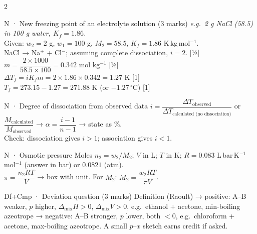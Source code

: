 \documentclass[10pt,a4paper]{extarticle}
\newcommand{\mk}[1]{{\scriptsize\color{black!55}[#1]}}
\begin{document}
\begin{multicols}{2}
\begin{skel}{N · New freezing point of an electrolyte solution (3 marks)}
\textit{e.g.\ 2 g NaCl (58.5) in 100 g water, $K_f=1.86$.}\\
Given: $w_2=2$ g, $w_1=100$ g, $M_2=58.5$, $K_f=1.86$ K\,kg\,mol$^{-1}$.\\
NaCl → Na$^+$ + Cl$^-$; assuming complete dissociation, $i=2$. \mk{½}\\
$m=\dfrac{2\times1000}{58.5\times100}=0.342$ mol kg$^{-1}$ \mk{½}\\
$\Delta T_f=iK_fm=2\times1.86\times0.342=1.27$ K \mk{1}\\
$T_f=273.15-1.27=\boxed{271.88\text{ K}}$ \;(or $-1.27\,^\circ$C) \mk{1}
\end{skel}
\begin{skel}{N · Degree of dissociation from observed data}
$i=\dfrac{\Delta T_\text{observed}}{\Delta T_\text{calculated (no dissociation)}}$ or $\dfrac{M_\text{calculated}}{M_\text{observed}}$ → $\alpha=\dfrac{i-1}{n-1}$ → state as \%.\\
Check: dissociation gives $i>1$; association gives $i<1$.
\end{skel}
\begin{skel}{N · Osmotic pressure}
Moles $n_2=w_2/M_2$; $V$ in L; $T$ in K; $R=0.083$ L\,bar\,K$^{-1}$mol$^{-1}$ (answer in bar) or $0.0821$ (atm).\\
$\pi=\dfrac{n_2RT}{V}$ → box with unit. For $M_2$: $M_2=\dfrac{w_2RT}{\pi V}$.
\end{skel}
\begin{skel}{Df+Cmp · Deviation question (3 marks)}
Definition (Raoult) → positive: A--B weaker, $p$ higher, $\Delta_\text{mix}H>0$, $\Delta_\text{mix}V>0$, e.g.\ ethanol + acetone, min-boiling azeotrope → negative: A--B stronger, $p$ lower, both $<0$, e.g.\ chloroform + acetone, max-boiling azeotrope. A small $p$--$x$ sketch earns credit if asked.
\end{skel}


\end{multicols}
\end{document}
